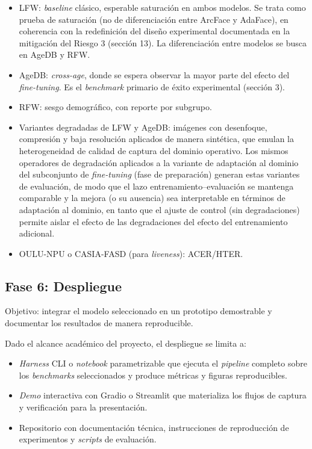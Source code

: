 \documentclass[
  11pt, %
]{charter}
\begin{document}
\begin{itemize}
  \item LFW: \textit{baseline} clásico, esperable saturación en ambos modelos. Se trata como prueba de saturación (no de diferenciación entre ArcFace y AdaFace), en coherencia con la redefinición del diseño experimental documentada en la mitigación del Riesgo 3 (sección 13). La diferenciación entre modelos se busca en AgeDB y RFW.
  \item AgeDB: \textit{cross-age}, donde se espera observar la mayor parte del efecto del \textit{fine-tuning}. Es el \textit{benchmark} primario de éxito experimental (sección 3).
  \item RFW: sesgo demográfico, con reporte por subgrupo.
  \item Variantes degradadas de LFW y AgeDB: imágenes con desenfoque, compresión y baja resolución aplicados de manera sintética, que emulan la heterogeneidad de calidad de captura del dominio operativo. Los mismos operadores de degradación aplicados a la variante de adaptación al dominio del subconjunto de \textit{fine-tuning} (fase de preparación) generan estas variantes de evaluación, de modo que el lazo entrenamiento--evaluación se mantenga comparable y la mejora (o su ausencia) sea interpretable en términos de adaptación al dominio, en tanto que el ajuste de control (sin degradaciones) permite aislar el efecto de las degradaciones del efecto del entrenamiento adicional.
  \item OULU-NPU o CASIA-FASD (para \textit{liveness}): ACER/HTER.
\end{itemize}

\subsection{Fase 6: Despliegue}

Objetivo: integrar el modelo seleccionado en un prototipo demostrable y documentar los resultados de manera reproducible.

Dado el alcance académico del proyecto, el despliegue se limita a:

\begin{itemize}
  \item \textit{Harness} CLI o \textit{notebook} parametrizable que ejecuta el \textit{pipeline} completo sobre los \textit{benchmarks} seleccionados y produce métricas y figuras reproducibles.
  \item \textit{Demo} interactiva con Gradio o Streamlit que materializa los flujos de captura y verificación para la presentación.
  \item Repositorio con documentación técnica, instrucciones de reproducción de experimentos y \textit{scripts} de evaluación.
\end{itemize}
\end{document}
